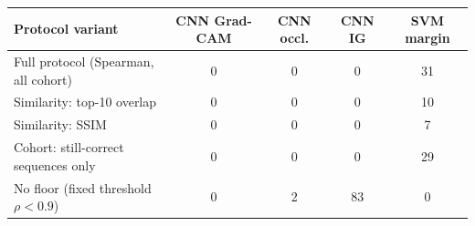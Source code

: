 \begin{tabular}{@{}lcccc@{}}\toprule
Protocol variant & CNN Grad-CAM & CNN occl. & CNN IG & SVM margin\\\midrule
Full protocol (Spearman, all cohort) & 0 & 0 & 0 & 31 \\
Similarity: top-10 overlap & 0 & 0 & 0 & 10 \\
Similarity: SSIM & 0 & 0 & 0 & 7 \\
Cohort: still-correct sequences only & 0 & 0 & 0 & 29 \\
No floor (fixed threshold $\rho<0.9$) & 0 & 2 & 83 & 0 \\
\bottomrule\end{tabular}
